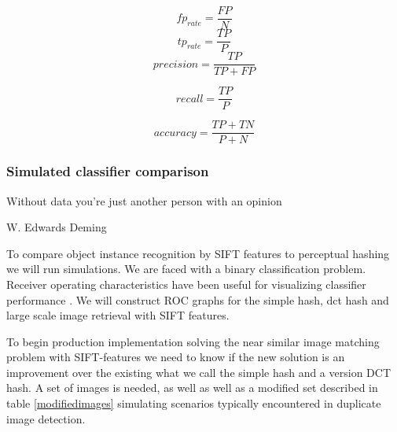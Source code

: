 \documentclass[english,12pt,a4paper,pdftex,elec,utf8]{aaltothesis}
\begin{document}
\begin{equation}
fp_{rate} = \frac{FP}{N}
\end{equation}
\begin{equation}
tp_{rate} = \frac{TP}{P}
\end{equation}
\begin{equation}
precision = \frac{TP}{TP + FP}
\end{equation}

\begin{equation}
recall = \frac{TP}{P}
\end{equation}

\begin{equation}
accuracy = \frac{TP + TN}{P + N}
\end{equation}

\subsubsection{Simulated classifier comparison}
\epigraph{Without data you're just another person with an opinion}{W. Edwards Deming}

To compare object instance recognition by SIFT features to perceptual hashing we will run simulations. We are faced with a binary classification problem. Receiver operating characteristics have been useful for visualizing classifier performance \cite{Fawcett2006}. We will construct ROC graphs for the simple hash, dct hash and large scale image retrieval with SIFT features.

To begin production implementation solving the near similar image matching problem with SIFT-features we need to know if the new solution is an improvement over the existing what we call the simple hash and a version DCT hash. A set of images is needed, as well as well as a modified set described in table \ref{modifiedimages} simulating scenarios typically encountered in duplicate image detection.
\end{document}
